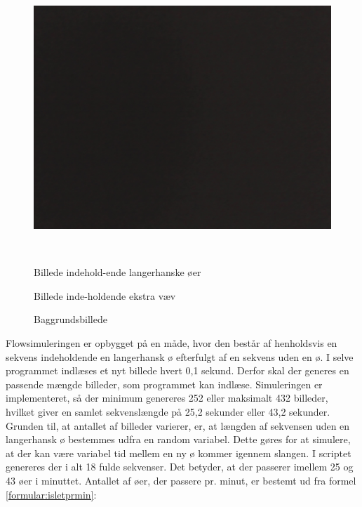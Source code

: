 \begin{figure}[H]
\begin{minipage}[b]{0.3\textwidth}
\includegraphics[width=1.00\textwidth]{billeder/software/3.jpg} %
\end{minipage} \\  %
\begin{minipage}[t]{0.3\textwidth}
\caption{Billede indehold-ende langerhanske øer} %
\label{fig:img1}
\end{minipage} \hfill
\begin{minipage}[t]{0.3\textwidth}
\caption{Billede inde-holdende ekstra væv} %
\label{fig:img2}
\end{minipage}
\hfill
\begin{minipage}[t]{0.3\textwidth}
\caption{Baggrundsbillede} %
\label{fig:img3}
\end{minipage}
\end{figure}
Flowsimuleringen er opbygget på en måde, hvor den består af henholdsvis en sekvens indeholdende en langerhansk ø efterfulgt af en sekvens uden en ø. I selve programmet indlæses et nyt billede hvert 0,1 sekund. Derfor skal der generes en passende mængde billeder, som programmet kan indlæse. Simuleringen er implementeret, så der minimum genereres 252 eller maksimalt 432 billeder, hvilket giver en samlet sekvenslængde på 25,2 sekunder eller 43,2 sekunder. Grunden til, at antallet af billeder varierer, er, at længden af sekvensen uden en langerhansk ø bestemmes udfra en random variabel. Dette gøres for at simulere, at der kan være variabel tid mellem en ny ø kommer igennem slangen. I scriptet genereres der i alt 18 fulde sekvenser. Det betyder, at der passerer imellem 25 og 43 øer i minuttet. Antallet af øer, der passere pr. minut, er bestemt ud fra formel \ref{formular:isletprmin}: 
